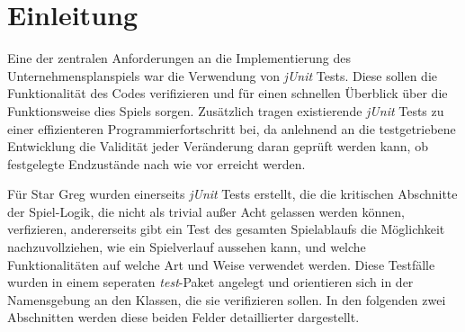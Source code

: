 \section{Einleitung}
\label{sec:junit-einleitung}


\newcommand{\junit}{\textit{jUnit}}

Eine der zentralen Anforderungen an die Implementierung des Unternehmensplanspiels war die Verwendung von \junit{} Tests. Diese sollen die Funktionalität des Codes verifizieren und für einen schnellen Überblick über die Funktionsweise dies Spiels sorgen. Zusätzlich tragen existierende \junit{} Tests zu einer effizienteren Programmierfortschritt bei, da anlehnend an die testgetriebene Entwicklung die Validität jeder Veränderung daran geprüft werden kann, ob festgelegte Endzustände nach wie vor erreicht werden.

Für Star Greg wurden einerseits \junit{} Tests erstellt, die die kritischen Abschnitte der Spiel-Logik, die nicht als trivial außer Acht gelassen werden können, verfizieren, andererseits gibt ein Test des gesamten Spielablaufs die Möglichkeit nachzuvollziehen, wie ein Spielverlauf aussehen kann, und welche Funktionalitäten auf welche Art und Weise verwendet werden. Diese Testfälle wurden in einem seperaten \textit{test}-Paket angelegt und orientieren sich in der Namensgebung an den Klassen, die sie verifizieren sollen. In den folgenden zwei Abschnitten werden diese beiden Felder detaillierter dargestellt.

\autorende{}